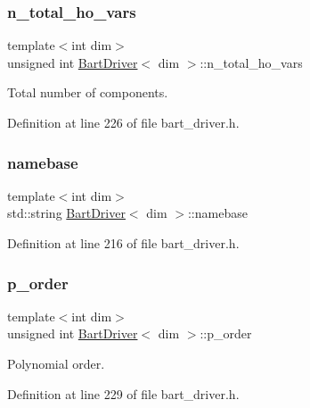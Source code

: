 \subsubsection{\texorpdfstring{n\+\_\+total\+\_\+ho\+\_\+vars}{n\_total\_ho\_vars}}
{\footnotesize\ttfamily template$<$int dim$>$ \\
unsigned int \hyperlink{class_bart_driver}{Bart\+Driver}$<$ dim $>$\+::n\+\_\+total\+\_\+ho\+\_\+vars\hspace{0.3cm}{\ttfamily [private]}}



Total number of components. 



Definition at line 226 of file bart\+\_\+driver.\+h.

\mbox{\label{class_bart_driver_a34229e58237aaac1551db7a3ec140e1c}} 
\subsubsection{\texorpdfstring{namebase}{namebase}}
{\footnotesize\ttfamily template$<$int dim$>$ \\
std\+::string \hyperlink{class_bart_driver}{Bart\+Driver}$<$ dim $>$\+::namebase\hspace{0.3cm}{\ttfamily [private]}}



Definition at line 216 of file bart\+\_\+driver.\+h.

\mbox{\label{class_bart_driver_ae6d782d30c28d741bb0df46251087809}} 
\subsubsection{\texorpdfstring{p\+\_\+order}{p\_order}}
{\footnotesize\ttfamily template$<$int dim$>$ \\
unsigned int \hyperlink{class_bart_driver}{Bart\+Driver}$<$ dim $>$\+::p\+\_\+order\hspace{0.3cm}{\ttfamily [private]}}



Polynomial order. 



Definition at line 229 of file bart\+\_\+driver.\+h.


